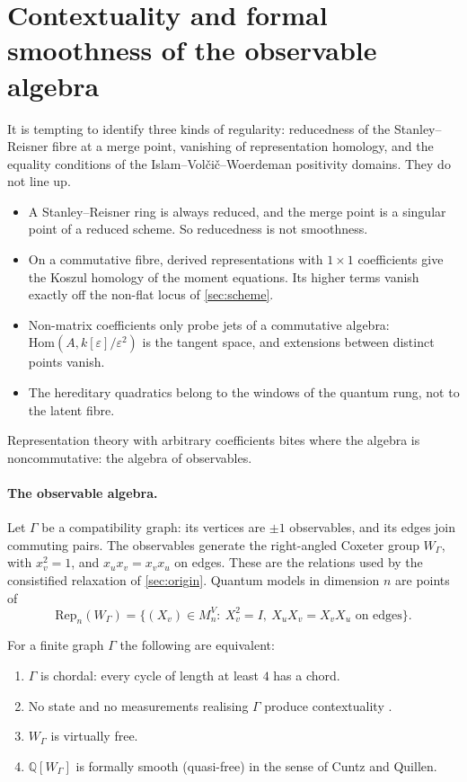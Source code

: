 \documentclass[11pt]{article}
\theoremstyle{definition}\newtheorem{definition}[theorem]{Definition}\newtheorem{remark}[theorem]{Remark}\newtheorem{example}[theorem]{Example}
\begin{document}
\section{Contextuality and formal smoothness of the observable algebra}\label{sec:coxeter}

It is tempting to identify three kinds of regularity: reducedness of the Stanley--Reisner fibre at a merge point, vanishing of
representation homology, and the equality conditions of the Islam--Volčič--Woerdeman positivity domains. They do not line up.
\begin{itemize}
\item A Stanley--Reisner ring is always reduced, and the merge point is a singular point of a reduced scheme. So reducedness is not
  smoothness.
\item On a commutative fibre, derived representations with $1\times1$ coefficients give the Koszul homology of the moment equations. Its
  higher terms vanish exactly off the non-flat locus of \cref{sec:scheme}.
\item Non-matrix coefficients only probe jets of a commutative algebra: $\mathrm{Hom}(A,k[\varepsilon]/\varepsilon^2)$ is the tangent
  space, and extensions between distinct points vanish.
\item The hereditary quadratics belong to the windows of the quantum rung, not to the latent fibre.
\end{itemize}
Representation theory with arbitrary coefficients \cite{Li2026} bites where the algebra is noncommutative: the algebra of observables.

\paragraph{The observable algebra.}
Let $\Gamma$ be a compatibility graph: its vertices are $\pm1$ observables, and its edges join commuting pairs. The observables generate
the right-angled Coxeter group $W_\Gamma$, with $x_v^2=1$, and $x_ux_v=x_vx_u$ on edges. These are the relations used by the
consistified relaxation of \cref{sec:origin}. Quantum models in dimension $n$ are points of
\[\mathrm{Rep}_n(W_\Gamma)=\{(X_v)\in M_n^{V}:\ X_v^2=I,\ X_uX_v=X_vX_u\text{ on edges}\}.\]

\begin{proposition}\label{prop:chordal}
For a finite graph $\Gamma$ the following are equivalent:
\begin{enumerate}
\item[(i)] $\Gamma$ is chordal: every cycle of length at least $4$ has a chord.
\item[(ii)] No state and no measurements realising $\Gamma$ produce contextuality \cite{XuCabello2019}.
\item[(iii)] $W_\Gamma$ is virtually free.
\item[(iv)] $\mathbb Q[W_\Gamma]$ is formally smooth (quasi-free) in the sense of Cuntz and Quillen.
\end{enumerate}
\end{proposition}
\end{document}
